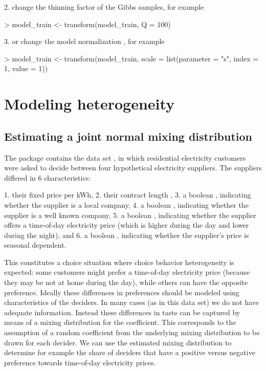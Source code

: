 \documentclass[article]{jss}
\begin{document}
2. change the thinning factor  of the Gibbs samples, for example
\begin{Schunk}
\begin{Sinput}
> model_train <- transform(model_train, Q = 100)
\end{Sinput}
\end{Schunk}

3. or change the model normalization , for example
\begin{Schunk}
\begin{Sinput}
> model_train <- transform(model_train, scale = list(parameter = "s", index = 1, value = 1))
\end{Sinput}
\end{Schunk}

\section{Modeling heterogeneity} \label{sec:modeling_heterogeneity}

\subsection{Estimating a joint normal mixing distribution} \label{subsec:normal_mix}

The  package \citep{Croissant:2020} contains the data set , in which residential electricity customers were asked to decide between four hypothetical electricity suppliers. The suppliers differed in 6 characteristics:

1. their fixed price  per kWh,
2. their contract length ,
3. a boolean , indicating whether the supplier is a local company,
4. a boolean , indicating whether the supplier is a well known company,
5. a boolean , indicating whether the supplier offers a time-of-day electricity price (which is higher during the day and lower during the night), and
6. a boolean , indicating whether the supplier's price is seasonal dependent.

This constitutes a choice situation where choice behavior heterogeneity is expected: some customers might prefer a time-of-day electricity price (because they may be not at home during the day), while others can have the opposite preference. Ideally these differences in preferences should be modeled using characteristics of the deciders. In many cases (as in this data set) we do not have adequate information. Instead these differences in taste can be captured by means of a mixing distribution for the  coefficient. This corresponds to the assumption of a random coefficient from the underlying mixing distribution to be drawn for each decider. We can use the estimated mixing distribution to determine for example the share of deciders that have a positive versus negative preference towards time-of-day electricity prices.
\end{document}
